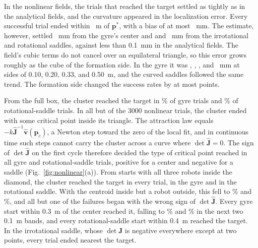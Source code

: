 \documentclass[lettersize,journal]{IEEEtran}
\newcommand{\rev}[1]{#1}                             %
\begin{document}
In the nonlinear fields, the trials that reached the target settled as tightly as in the analytical fields, and the curvature appeared in the localization error. Every successful trial ended within ~m of $\mathbf{p}^*$, with a bias of at most ~mm. The estimate, however, settled ~mm from the gyre's center and  and ~mm from the irrotational and rotational saddles, against less than \rev{0.1}~mm in the analytical fields. The field's cubic terms do not cancel over an equilateral triangle, so this error grows roughly as the cube of the formation side. In the gyre it was , , , and ~mm at sides of 0.10, 0.20, 0.33, and 0.50~m, and the curved saddles followed the same trend. The formation side changed the success rates by at most  points. %

From the full box, the cluster reached the target in \% of gyre trials and \% of rotational-saddle trials. In all but  of the 3000 nonlinear trials, the cluster ended with some critical point inside its triangle. The attraction law equals $-k\hat{\mathbf{J}}^{-1}\hat{\mathbf{v}}(\mathbf{p}_c)$, a Newton step toward the zero of the local fit, and in continuous time such steps cannot carry the cluster across a curve where $\det\hat{\mathbf{J}} = 0$. The sign of $\det\hat{\mathbf{J}}$ on the first cycle therefore decided the type of critical point reached in all  gyre and rotational-saddle trials, positive for a center and negative for a saddle (Fig.~\ref{fig:nonlinear}(a)). From starts with all three robots inside the diamond, the cluster reached the target in every trial,  in the gyre and  in the rotational saddle. With the centroid inside but a robot outside, this fell to \% and \%, and all but one of the failures began with the wrong sign of $\det\hat{\mathbf{J}}$. Every gyre start within 0.3~m of the center reached it, falling to \% and \% in the next two 0.1~m bands, and every rotational-saddle start within 0.4~m reached the target. In the irrotational saddle, whose $\det\mathbf{J}$ is negative everywhere except at two points, every trial ended nearest the target. %
\end{document}
